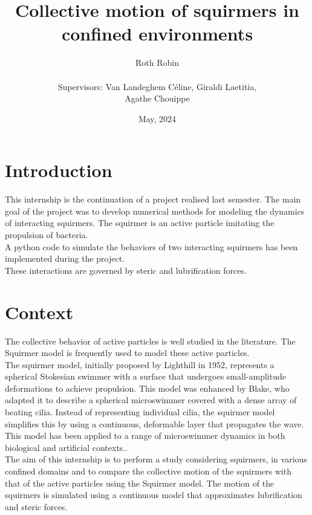 \documentclass{article}
\begin{document}
\title{Collective motion of squirmers in confined environments}
\author{Roth Robin\\
\\
Supervisors: Van Landeghem Céline, Giraldi Laetitia,\\ Agathe Chouippe}
\date{May, 2024}
\maketitle

\tableofcontents
\newpage
\section{Introduction}
This internship is the continuation of a project realised last semester. The main goal of the project was
to develop numerical methods for modeling the dynamics of interacting squirmers. The squirmer is an active particle imitating the propulsion of bacteria.\\
A python code to simulate the behaviors of two interacting squirmers has been implemented during the project.\\
These interactions are governed by steric and lubrification forces.

\section{Context}
The collective behavior of active particles is well studied in the literature. 
The Squirmer model is frequently used to model these active particles. \\
The squirmer model, initially proposed by Lighthill in 1952, represents a spherical Stokesian swimmer with a surface that undergoes small-amplitude deformations to achieve propulsion. This model was enhanced by Blake, who adapted it to describe a spherical microswimmer covered with a dense array of beating cilia. Instead of representing individual cilia, the squirmer model simplifies this by using a continuous, deformable layer that propagates the wave.
This model has been applied to a range of microswimmer dynamics in both biological and artificial contexts..\\
The aim of this internship is to perform a study considering squirmers, 
in various confined domains and to compare the collective motion of the squirmers with that of the active particles using the Squirmer model. 
The motion of the squirmers is simulated using a continuous model that approximates lubrification and 
steric forces\cite{Brumley}\cite{Lauga}.
\end{document}
